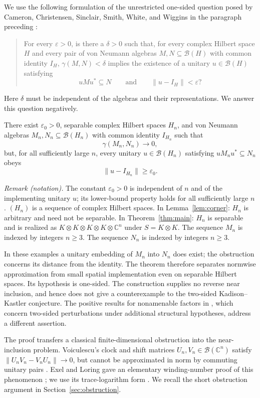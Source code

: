 We use the following formulation of the unrestricted one-sided question
posed by Cameron, Christensen, Sinclair, Smith, White, and Wiggins in
the paragraph preceding \cite[Theorem~2]{CCSSWW2012}:
\begin{quote}
For every $\varepsilon>0$, is there a $\delta>0$ such that, for every
complex Hilbert space $H$ and every pair of von Neumann algebras
$M,N\subseteq\mathcal B(H)$ with common identity $I_H$,
$\gamma(M,N)<\delta$ implies the existence of a unitary
$u\in\mathcal B(H)$ satisfying
\[
 uMu^*\subseteq N
 \qquad\text{and}\qquad
 \|u-I_H\|<\varepsilon?
\]
\end{quote}
Here $\delta$ must be independent of the algebras and their
representations.  We answer this question negatively.

\begin{theorem}\label{thm:main}
There exist $\varepsilon_0>0$, separable complex Hilbert spaces $H_n$,
and von Neumann algebras $M_n,N_n\subseteq\mathcal B(H_n)$ with common
identity $I_{H_n}$ such that
\[
 \gamma(M_n,N_n)\longrightarrow 0,
\]
but, for all sufficiently large $n$, every unitary
$u\in\mathcal B(H_n)$ satisfying $uM_nu^*\subseteq N_n$ obeys
\[
 \|u-I_{H_n}\|\geq\varepsilon_0.
\]
\end{theorem}

\noindent\textit{Remark (notation).} The constant $\varepsilon_0>0$ is independent of $n$ and of the implementing unitary $u$; its lower-bound property holds for all sufficiently large $n$. $(H_n)$ is a sequence of complex Hilbert spaces. In Lemma~\ref{lem:corner}: $H_n$ is arbitrary and need not be separable. In Theorem~\ref{thm:main}: $H_n$ is separable and is realized as $K\otimes K\otimes K\otimes K\otimes\mathbb C^n$ under $S=K\otimes K$. The sequence $M_n$ is indexed by integers $n\geq3$. The sequence $N_n$ is indexed by integers $n\geq3$.


In these examples a unitary embedding of $M_n$ into $N_n$ does exist;
the obstruction concerns its distance from the identity.  The theorem
therefore separates normwise approximation from small spatial
implementation even on separable Hilbert spaces.  Its hypothesis is
one-sided.  The construction supplies no reverse near inclusion, and
hence does not give a counterexample to the two-sided Kadison--Kastler
conjecture.  The positive results for nonamenable factors in
\cite{CCSSWW2012}, which concern two-sided perturbations under additional
structural hypotheses, address a different assertion.

The proof transfers a classical finite-dimensional obstruction into the
near-inclusion problem.  Voiculescu's clock and shift matrices
$U_n,V_n\in\mathcal B(\mathbb C^n)$ satisfy
$\|U_nV_n-V_nU_n\|\to0$, but cannot be approximated in norm by commuting
unitary pairs \cite{Voi1983}.  Exel and Loring gave an elementary
winding-number proof of this phenomenon \cite{EL1989}; we use its trace-logarithm form
\cite[Lemma~3.1]{Exel1993}.  We recall the short obstruction argument
in Section~\ref{sec:obstruction}.

